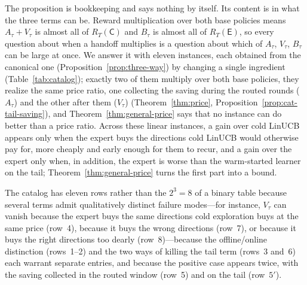 \documentclass{article}
\theoremstyle{definition}
\theoremstyle{remark}
\theoremstyle{remark}
\newcommand{\Cold}{\mathsf{C}}
\newcommand{\Exp}{\mathsf{E}}
\begin{document}
The proposition is bookkeeping and says nothing by itself. Its content is in
what the three terms can be. Reward multiplication over both base policies
means $A_\tau+V_\tau$ is almost all of $R_T(\Cold)$ and $B_\tau$ is almost all
of $R_T(\Exp)$, so every question about when a handoff multiplies is a
question about which of $A_\tau$, $V_\tau$, $B_\tau$ can be large at once. We
answer it with eleven instances, each obtained from the canonical one
(Proposition~\ref{prop:three-way}) by changing a single ingredient
(Table~\ref{tab:catalog}); exactly two of them multiply over both base
policies, they realize the same price ratio, one collecting the saving during
the routed rounds ($A_\tau$) and the other after them ($V_\tau$)
(Theorem~\ref{thm:price}, Proposition~\ref{prop:cat-tail-saving}), and
Theorem~\ref{thm:general-price} says that no instance can do better than a
price ratio. Across these linear instances, a gain over cold LinUCB appears
only when the expert buys the directions cold LinUCB would otherwise pay for,
more cheaply and early enough for them to recur, and a gain over the expert
only when, in addition, the expert is worse than the warm-started learner on
the tail; Theorem~\ref{thm:general-price} turns the first part into a bound.

The catalog has eleven rows rather than the $2^3=8$ of a binary table
because several terms admit qualitatively distinct failure modes---for
instance, $V_\tau$ can vanish because the expert buys the same directions cold
exploration buys at the same price (row~4), because it buys the wrong
directions (row~7), or because it buys the right directions too dearly
(row~8)---because the offline/online distinction (rows~1--2) and the two
ways of killing the tail term (rows~3 and~6) each warrant separate entries,
and because the positive case appears twice, with the saving collected in
the routed window (row~5) and on the tail (row~$5'$).
\end{document}
